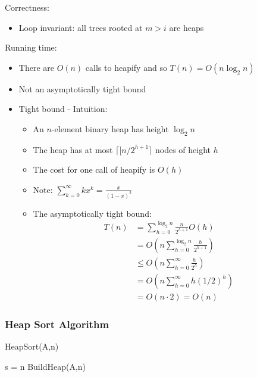Correctness:
\begin{itemize}
    \item Loop invariant: all trees rooted at $m>i$ are heaps
\end{itemize}
Running time:
\begin{itemize}
    \item There are $O(n)$ calls to heapify and so $T(n) = O(n \log_2 n)$
    \item Not an asymptotically tight bound 
    \item Tight bound - Intuition:
    \begin{itemize}
        \item An $n$-element binary heap has height $\log_2 n$
        \item The heap has at most $\lceil[n/2^{h+1}\rceil$ nodes of height $h$
        \item The cost for one call of heapify is $O(h)$
        \item Note: $\sum_{k=0}^\infty kx^k = \frac{x}{(1-x)^2}$
        \item The asymptotically tight bound: 
        \begin{align*}
            T(n) &= \sum_{h=0}^{\log_2 n} \frac{n}{2^{h+1}} O(h) \\
            &= O\left( n\sum_{h=0}^{\log_2 n} \frac{h}{2^{h+1}} \right) \\
            & \leq O\left( n\sum_{h=0}^\infty \frac{h}{2^h}\right)\\
            &= O \left( n\sum_{h=0}^\infty h (1/2)^h\right) \\
            &= O(n\cdot 2) = O(n)
        \end{align*}
    \end{itemize}
\end{itemize}

\subsubsection{Heap Sort Algorithm}

\begin{center}
\begin{minipage}{0.6\textwidth} %
\centering %
\begin{algorithm}[H]
\caption{HeapSort(A,n)}
s = n\;
BuildHeap(A,n)\;
\end{algorithm}
\end{minipage}
\end{center}

